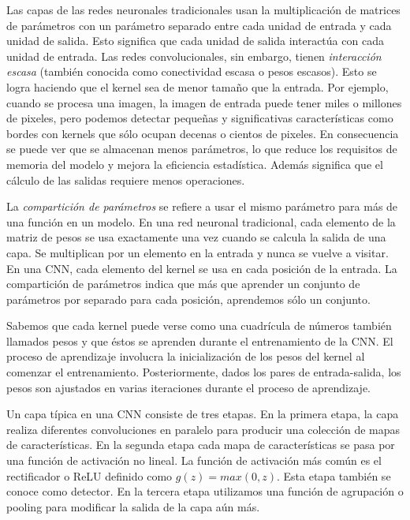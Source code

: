 Las capas de las redes neuronales tradicionales usan la multiplicación de matrices de parámetros con
un parámetro separado entre cada unidad de entrada y cada unidad de salida. Esto significa que cada 
unidad de salida interactúa con cada unidad de entrada. Las redes convolucionales, sin embargo, 
tienen \textit{interacción escasa} (también conocida como 
conectividad escasa o pesos escasos). Esto se logra haciendo que el kernel sea de menor
tamaño que la entrada. Por ejemplo, cuando se procesa una imagen, la imagen de entrada puede tener 
miles o millones de pixeles, pero podemos detectar pequeñas y significativas características como
bordes con kernels que sólo ocupan decenas o cientos de pixeles. En consecuencia se puede ver
que se almacenan menos parámetros, lo que reduce los requisitos de memoria del modelo 
y mejora la eficiencia estadística. Además significa que el cálculo de las salidas requiere menos 
operaciones.

La \textit{compartición de parámetros} se refiere a usar el mismo parámetro para más de una función
en un modelo. En una red neuronal tradicional, cada elemento de la matriz de pesos se usa 
exactamente una vez cuando se calcula la salida de una capa. Se multiplican por un elemento en la 
entrada y nunca se vuelve a visitar. En una CNN, cada elemento del kernel se usa en cada posición de la
entrada. La compartición de parámetros indica que más que aprender un conjunto de parámetros 
por separado para cada posición, aprendemos sólo un conjunto. 


Sabemos que cada kernel puede verse como una cuadrícula de números también llamados pesos
y que éstos se aprenden durante el entrenamiento de la CNN. El proceso de aprendizaje involucra 
la inicialización de los pesos del kernel al comenzar el entrenamiento. Posteriormente, dados los pares
de entrada-salida, los pesos son ajustados en varias iteraciones durante el proceso de aprendizaje.\\

\begin{remark}
Un capa típica en una CNN consiste de tres etapas. En la 
primera etapa, la capa realiza diferentes convoluciones en
paralelo para producir una colección de mapas de
características. En la segunda etapa cada mapa 
de características se pasa por una función de activación
no lineal. La función de activación más común es el 
rectificador o ReLU definido como $g(z) = max(0, z)$.
Esta etapa también se conoce como detector.
En la tercera etapa utilizamos una función de agrupación
o pooling para modificar la salida de la capa aún más.
\end{remark}

